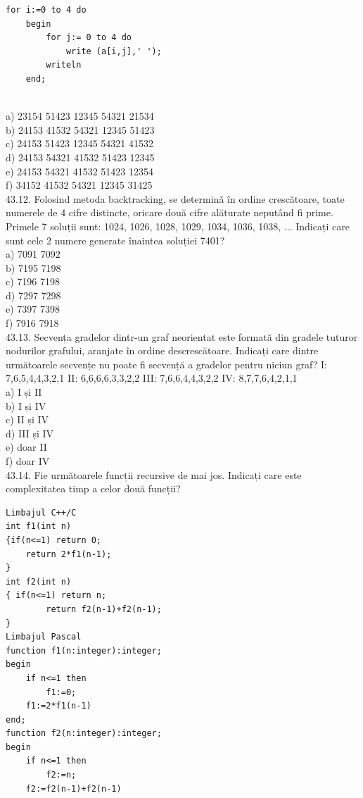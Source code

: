 \begin{itemize}
\begin{enumerate}
\begin{verbatim}
for i:=0 to 4 do
    begin
        for j:= 0 to 4 do
            write (a[i,j],' ');
        writeln
    end;
\end{verbatim}
\\
a) 23154
   51423
   12345
   54321
   21534
\\
b) 24153
   41532
   54321
   12345
   51423
\\
c) 24153
   51423
   12345
   54321
   41532
\\
d) 24153
   54321
   41532
   51423
   12345
\\
e) 24153
   54321
   41532
   51423
   12354
\\
f) 34152
   41532
   54321
   12345
   31425
\\
43.12. Folosind metoda backtracking, se determină în ordine crescătoare, toate numerele de 4 cifre distincte, oricare două cifre alăturate neputând fi prime. Primele 7 soluții sunt: 1024, 1026, 1028, 1029, 1034, 1036, 1038, ... Indicați care sunt cele 2 numere generate înaintea soluției 7401?
\\
a) 7091 7092
\\
b) 7195 7198
\\
c) 7196 7198
\\
d) 7297 7298
\\
e) 7397 7398
\\
f) 7916 7918
\\
43.13. Secvența gradelor dintr-un graf neorientat este formată din gradele tuturor nodurilor grafului, aranjate în ordine descrescătoare. Indicați care dintre următoarele secvențe nu poate fi secvență a gradelor pentru niciun graf?
I: 7,6,5,4,4,3,2,1
II: 6,6,6,6,3,3,2,2
III: 7,6,6,4,4,3,2,2
IV: 8,7,7,6,4,2,1,1
\\
a) I și II
\\
b) I și IV
\\
c) II și IV
\\
d) III și IV
\\
e) doar II
\\
f) doar IV
\\
43.14. Fie următoarele funcții recursive de mai jos. Indicați care este complexitatea timp a celor două funcții?
\begin{verbatim}
Limbajul C++/C
int f1(int n)
{if(n<=1) return 0;
    return 2*f1(n-1);
}
int f2(int n)
{ if(n<=1) return n;
        return f2(n-1)+f2(n-1);
}
Limbajul Pascal
function f1(n:integer):integer;
begin
    if n<=1 then
        f1:=0;
    f1:=2*f1(n-1)
end;
function f2(n:integer):integer;
begin
    if n<=1 then 
        f2:=n;
    f2:=f2(n-1)+f2(n-1)

\end{verbatim}
\end{enumerate}
\end{itemize}
